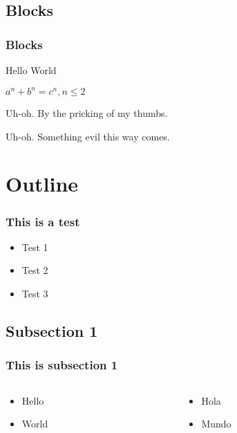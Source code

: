 \documentclass[]{beamer}
\begin{document}
\subsection{Blocks}
\begin{frame}
\frametitle{Blocks}
\begin{definition}[Greetings]
Hello World
\end{definition}

\begin{theorem}
$a^n + b^n = c^n, n \leq 2$
\end{theorem}

\begin{alertblock}{Uh-oh.}
By the pricking of my thumbs.
\end{alertblock}

\begin{exampleblock}{Uh-oh.}
Something evil this way comes.
\end{exampleblock}

\end{frame}

\section{Outline}

\begin{frame}
    \frametitle{This is a test}
    \begin{itemize}
        \item<1->Test 1
        \item<2->Test 2
        \item<3->Test 3
    \end{itemize}
\end{frame}

\subsection{Subsection 1}

\begin{frame}
    \frametitle{This is subsection 1}
    \begin{columns}
        \begin{column}{5cm} %
            \begin{itemize}
                \item Hello
                \item World
            \end{itemize}
        \end{column}
        \begin{column}{5cm} %
            \begin{itemize}
                \item Hola
                \item Mundo
            \end{itemize}
        \end{column}
    \end{columns}
\end{frame}
\end{document}
